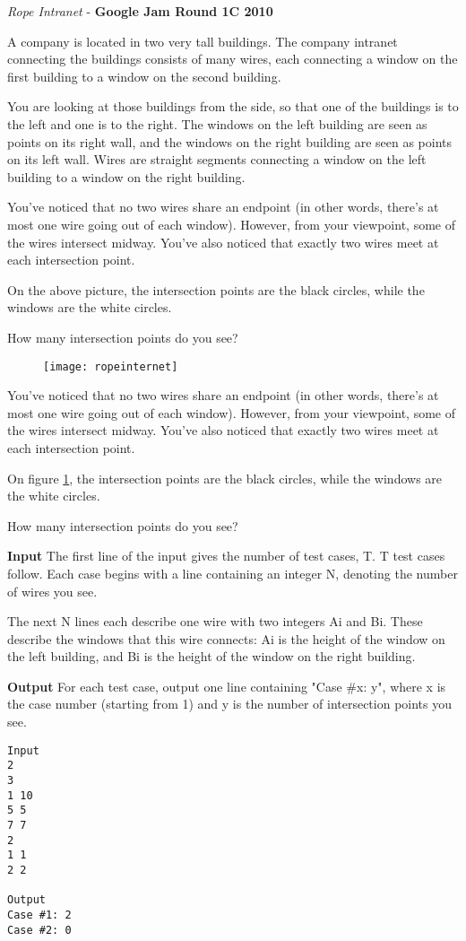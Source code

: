 \begin{problem}{\textit{Rope Intranet} - \textbf{Google Jam Round 1C 2010}}

A company is located in two very tall buildings. The company intranet connecting the buildings consists of many wires, each connecting a window on the first building to a window on the second building.

You are looking at those buildings from the side, so that one of the buildings is to the left and one is to the right. The windows on the left building are seen as points on its right wall, and the windows on the right building are seen as points on its left wall. Wires are straight segments connecting a window on the left building to a window on the right building.

You've noticed that no two wires share an endpoint (in other words, there's at most one wire going out of each window). However, from your viewpoint, some of the wires intersect midway. You've also noticed that exactly two wires meet at each intersection point.

On the above picture, the intersection points are the black circles, while the windows are the white circles.

How many intersection points do you see?

\begin{figure}
\centering
\texttt{[image: ropeinternet]}
\caption{}
\label{fig:ropeinternet}
\end{figure}

You've noticed that no two wires share an endpoint (in other words, there's at most one wire going out of each window). However, from your viewpoint, some of the wires intersect midway. You've also noticed that exactly two wires meet at each intersection point.

On figure \ref{fig:ropeinternet}, the intersection points are the black circles, while the windows are the white circles.

How many intersection points do you see?



\textbf{Input}
The first line of the input gives the number of test cases, T. T test cases follow. Each case begins with a line containing an integer N, denoting the number of wires you see.

The next N lines each describe one wire with two integers Ai and Bi. These describe the windows that this wire connects: Ai is the height of the window on the left building, and Bi is the height of the window on the right building.


\textbf{Output}
For each test case, output one line containing "Case \#x: y", where x is the case number (starting from 1) and y is the number of intersection points you see.

\begin{framed}
	\begin{verbatim}
Input 
2
3
1 10
5 5
7 7
2
1 1
2 2

Output 
Case #1: 2
Case #2: 0
	\end{verbatim}
\end{framed}

\end{problem}

